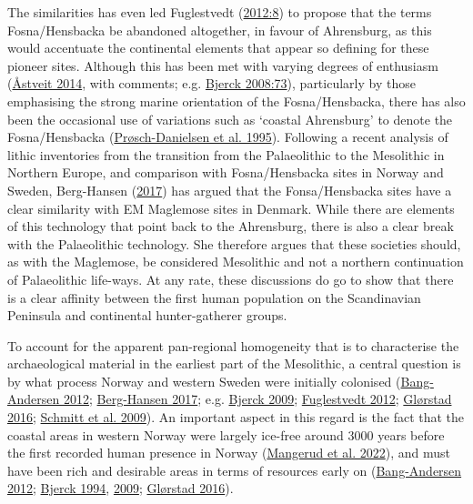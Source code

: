 \documentclass[
  a4paper,
  oneside]{uiophdthesis}
\begin{document}
The similarities has even led Fuglestvedt (\protect\hyperlink{ref-fuglestvedt2012}{2012:8}) to propose that the terms Fosna/Hensbacka be abandoned altogether, in favour of Ahrensburg, as this would accentuate the continental elements that appear so defining for these pioneer sites. Although this has been met with varying degrees of enthusiasm (\protect\hyperlink{ref-uxe5stveit2014}{Åstveit 2014}, with comments; e.g. \protect\hyperlink{ref-bjerck2008}{Bjerck 2008:73}), particularly by those emphasising the strong marine orientation of the Fosna/Hensbacka, there has also been the occasional use of variations such as `coastal Ahrensburg' to denote the Fosna/Hensbacka (\protect\hyperlink{ref-pruxf8sch-danielsen1995}{Prøsch-Danielsen et al. 1995}). Following a recent analysis of lithic inventories from the transition from the Palaeolithic to the Mesolithic in Northern Europe, and comparison with Fosna/Hensbacka sites in Norway and Sweden, Berg-Hansen (\protect\hyperlink{ref-berg-hansen2017}{2017}) has argued that the Fonsa/Hensbacka sites have a clear similarity with EM Maglemose sites in Denmark. While there are elements of this technology that point back to the Ahrensburg, there is also a clear break with the Palaeolithic technology. She therefore argues that these societies should, as with the Maglemose, be considered Mesolithic and not a northern continuation of Palaeolithic life-ways. At any rate, these discussions do go to show that there is a clear affinity between the first human population on the Scandinavian Peninsula and continental hunter-gatherer groups.

To account for the apparent pan-regional homogeneity that is to characterise the archaeological material in the earliest part of the Mesolithic, a central question is by what process Norway and western Sweden were initially colonised (\protect\hyperlink{ref-bang-andersen2012}{Bang-Andersen 2012}; \protect\hyperlink{ref-berg-hansen2017}{Berg-Hansen 2017}; e.g. \protect\hyperlink{ref-bjerck2009}{Bjerck 2009}; \protect\hyperlink{ref-fuglestvedt2012}{Fuglestvedt 2012}; \protect\hyperlink{ref-glorstad2016}{Glørstad 2016}; \protect\hyperlink{ref-schmitt2009}{Schmitt et al. 2009}). An important aspect in this regard is the fact that the coastal areas in western Norway were largely ice-free around 3000 years before the first recorded human presence in Norway (\protect\hyperlink{ref-mangerud2022}{Mangerud et al. 2022}), and must have been rich and desirable areas in terms of resources early on (\protect\hyperlink{ref-bang-andersen2012}{Bang-Andersen 2012}; \protect\hyperlink{ref-bjerck1994}{Bjerck 1994}, \protect\hyperlink{ref-bjerck2009}{2009}; \protect\hyperlink{ref-glorstad2016}{Glørstad 2016}).
\end{document}
